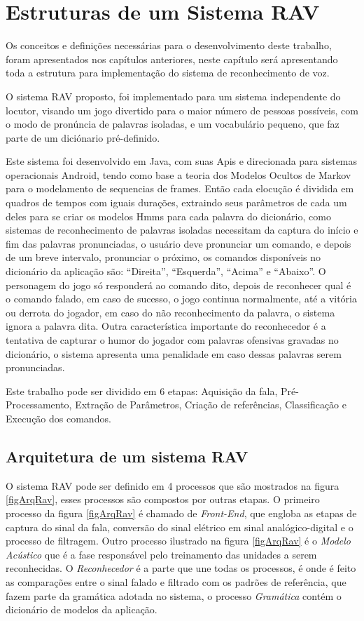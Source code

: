 \chapter{Estruturas de um Sistema RAV}
Os conceitos e definições necessárias para o desenvolvimento deste trabalho, foram apresentados nos capítulos anteriores, neste capítulo será apresentando toda a estrutura para implementação do sistema de reconhecimento de voz.

O sistema RAV proposto, foi implementado para um sistema independente do locutor, visando um jogo divertido para o maior número de pessoas possíveis, com o modo de pronúncia de palavras isoladas, e um vocabulário pequeno, que faz parte de um diciónario pré-definido. 

Este sistema foi desenvolvido em Java, com suas Apis e direcionada para sistemas operacionais Android, tendo como base a teoria dos Modelos Ocultos de Markov para o modelamento de sequencias de frames. Então cada elocução é dividida em quadros de tempos com iguais durações, extraindo seus parâmetros de cada um deles para se criar os modelos Hmms para cada palavra do dicionário, como sistemas de reconhecimento de palavras isoladas necessitam da captura do início e fim das palavras pronunciadas, o usuário deve pronunciar um comando, e depois de um breve intervalo, pronunciar o próximo, os comandos disponíveis no dicionário da aplicação são: “Direita”, “Esquerda”, “Acima” e “Abaixo”. O personagem do jogo só responderá ao comando dito, depois de reconhecer qual é o comando falado, em caso de sucesso, o jogo continua normalmente, até a vitória ou derrota do jogador, em caso do não reconhecimento da palavra, o sistema ignora a palavra dita. Outra característica importante do reconhecedor é a tentativa de capturar o humor do jogador com palavras ofensivas gravadas no dicionário, o sistema apresenta uma penalidade em caso dessas palavras serem pronunciadas.

Este trabalho pode ser dividido em 6 etapas: Aquisição da fala, Pré-Processamento, Extração de Parâmetros, Criação de referências, Classificação e Execução dos comandos.

\section{Arquitetura de um sistema RAV}
O sistema RAV pode ser definido em 4 processos que são mostrados na figura \ref{figArqRav}, esses processos são compostos por outras etapas. O primeiro processo da figura \ref{figArqRav} é chamado de \textit{Front-End}, que engloba as etapas de captura do sinal da fala, conversão do sinal elétrico em sinal analógico-digital e o processo de filtragem. Outro processo ilustrado na figura \ref{figArqRav} é o \textit{Modelo Acústico} que é a fase responsável pelo treinamento das unidades a serem reconhecidas. O \textit{Reconhecedor} é a parte que une todas os processos, é onde é feito as comparações entre o sinal falado e filtrado com os padrões de referência, que fazem parte da gramática adotada no sistema, o processo \textit{Gramática} contém o dicionário de modelos da aplicação. 

